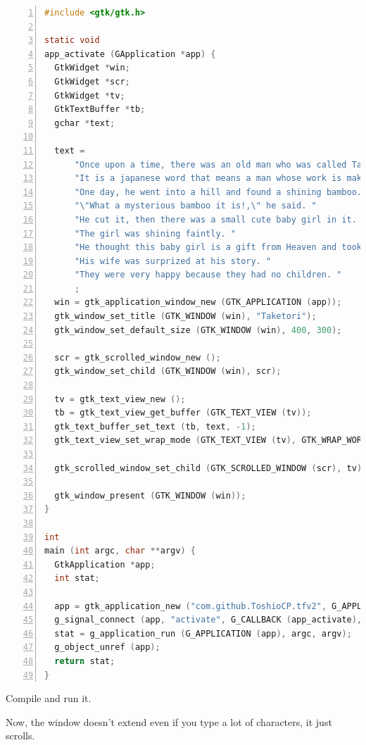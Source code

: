 \begin{lstlisting}[language=C, numbers=left]
#include <gtk/gtk.h>

static void
app_activate (GApplication *app) {
  GtkWidget *win;
  GtkWidget *scr;
  GtkWidget *tv;
  GtkTextBuffer *tb;
  gchar *text;

  text =
      "Once upon a time, there was an old man who was called Taketori-no-Okina. "
      "It is a japanese word that means a man whose work is making bamboo baskets.\n"
      "One day, he went into a hill and found a shining bamboo. "
      "\"What a mysterious bamboo it is!,\" he said. "
      "He cut it, then there was a small cute baby girl in it. "
      "The girl was shining faintly. "
      "He thought this baby girl is a gift from Heaven and took her home.\n"
      "His wife was surprized at his story. "
      "They were very happy because they had no children. "
      ;
  win = gtk_application_window_new (GTK_APPLICATION (app));
  gtk_window_set_title (GTK_WINDOW (win), "Taketori");
  gtk_window_set_default_size (GTK_WINDOW (win), 400, 300);

  scr = gtk_scrolled_window_new ();
  gtk_window_set_child (GTK_WINDOW (win), scr);

  tv = gtk_text_view_new ();
  tb = gtk_text_view_get_buffer (GTK_TEXT_VIEW (tv));
  gtk_text_buffer_set_text (tb, text, -1);
  gtk_text_view_set_wrap_mode (GTK_TEXT_VIEW (tv), GTK_WRAP_WORD_CHAR);

  gtk_scrolled_window_set_child (GTK_SCROLLED_WINDOW (scr), tv);

  gtk_window_present (GTK_WINDOW (win));
}

int
main (int argc, char **argv) {
  GtkApplication *app;
  int stat;

  app = gtk_application_new ("com.github.ToshioCP.tfv2", G_APPLICATION_DEFAULT_FLAGS);
  g_signal_connect (app, "activate", G_CALLBACK (app_activate), NULL);
  stat = g_application_run (G_APPLICATION (app), argc, argv);
  g_object_unref (app);
  return stat;
}
\end{lstlisting}

Compile and run it.

Now, the window doesn't extend even if you type a lot of characters, it
just scrolls.
